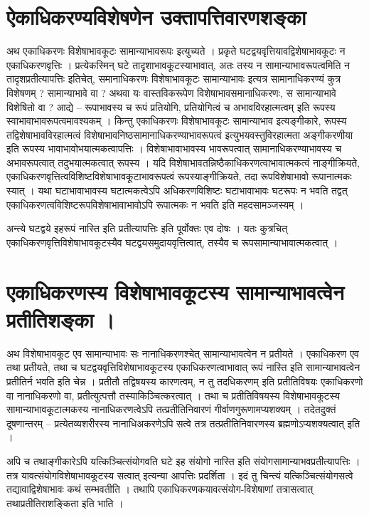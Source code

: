 \section*{ऐकाधिकरण्यविशेषणेन उक्तापत्तिवारणशङ्का} 

अथ एकाधिकरणः विशेषाभावकूटः सामान्याभावरूपः इत्युच्यते । प्रकृते घटद्वयवृत्तियावद्विशेषाभावकूटः न एकाधिकरणवृत्तिः । प्रत्येकस्मिन् घटे तादृशाभावकूटस्याभावात्, अतः तस्य न सामान्याभावरूपत्वमिति न तादृशप्रतीत्यापत्तिः इतिचेत्, समानाधिकरणः विशेषाभावकूटः सामान्याभावः इत्यत्र सामानाधिकरण्यं कुत्र विशेषणम् ? सामान्याभावे वा ? अथवा यः वास्तविकरूपेण विशेषाभावसमानाधिकरणः, स सामान्याभावे विशेषितो वा ? आद्ये – रूपाभावस्य च रूपं प्रतियोगि, प्रतियोगित्वं च अभावविरहात्मत्वम् इति रूपस्य स्वाभावाभावरूपत्वमावश्यकम् । किन्तु एकाधिकरणः विशेषाभावकूटः सामान्याभाव इत्यङ्गीकारे, रूपस्य तद्विशेषाभावविरहात्मत्वं विशेषाभावनिष्ठसामानाधिकरण्याभावरूपत्वं इत्युभयवस्तुविरहात्मता अङ्गीकरणीया इति रूपस्य  भावाभावोभयात्मकत्वापत्तिः । विशेषाभावाभावस्य भावरूपत्वात् सामानाधिकरण्याभावस्य च अभावरूपत्वात् तदुभयात्मकत्वात् रूपस्य । यदि विशेषाभावतन्निष्ठैकाधिकरणत्वाभावात्मकत्वं नाङ्गीक्रियते, एकाधिकरणवृत्तित्वविशिष्टविशेषाभावकूटाभावरूपत्वं रूपस्याङ्गीक्रियते, तदा रूपविशेषाभावो रूपानात्मकः स्यात् । यथा घटाभावाभावस्य घटात्मकत्वेऽपि अधिकरणविशिष्टः घटाभावाभावः घटरूपः न भवति तद्वत् एकाधिकरणत्वविशिष्टरूपविशेषाभावाभावोऽपि रूपात्मकः न भवति इति महदसामञ्जस्यम् ।

अन्त्ये घटद्वये इहरूपं नास्ति इति प्रतीत्यापत्तिः इति पूर्वोक्तः एव दोषः । यतः कुत्रचित् एकाधिकरणवृत्तिविशेषाभावकूटस्यैव घटद्वयसमुदायवृत्तित्वात्, तस्यैव च रूपसामान्याभावात्मकत्वात् ।

\section*{एकाधिकरणस्य विशेषाभावकूटस्य सामान्याभावत्वेन प्रतीतिशङ्का ।}

अथ विशेषाभावकूट एव सामान्याभावः सः नानाधिकरणश्चेत् सामान्याभावत्वेन न प्रतीयते । एकाधिकरण एव तथा प्रतीयते, तथा च घटद्वयवृत्तिविशेषाभावकूटस्य एकाधिकरणत्वाभावात् रूपं नास्ति इति सामान्याभावत्वेन प्रतीतिर्न भवति इति चेन्न । प्रतीतौ तद्विषयस्य कारणत्वम्, न तु तदधिकरणम् इति प्रतीतिविषयः एकाधिकरणो वा नानाधिकरणो वा, प्रतीत्युत्पत्तौ तस्याकिञ्चित्करत्वात् । तथा च प्रतीतिविषयस्य विशेषाभावकूटस्य सामान्याभावकूटात्मकस्य नानाधिकरणत्वेऽपि तत्प्रतीतिनिवारणं गीर्वाणगुरूणामप्यशक्यम् । तदेतदुक्तं दूषणान्तरम् – प्रत्येतव्यशरीरस्य नानाधिअकरणेऽपि सत्वे तत्र तत्प्रतीतिनिवारणस्य ब्रह्मणोऽप्यशक्यत्वात्  इति ।

अपि च तथाङ्गीकारेऽपि यत्किञ्चित्संयोगवति घटे इह संयोगो नास्ति इति संयोगसामान्याभवप्रतीत्यापत्तिः । तत्र यावत्संयोगविशेषाभावकूटस्य सत्वात् इत्यन्या आपत्तिः प्रदर्शिता । इदं तु चिन्त्यं यत्किञ्चित्संयोगसत्वे तद्यावाद्विशेषाभावः कथं सम्भवतीति । तथापि एकाधिकरणकयावत्संयोग-विशेषाणां तत्रासत्वात् तथाप्रतीतिराशङ्किता इति भाति ।


